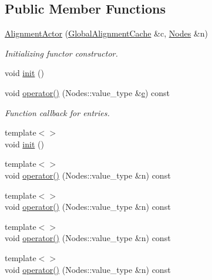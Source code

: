 \subsection*{Public Member Functions}
\begin{DoxyCompactItemize}
\item 
\hyperlink{class_d_d4hep_1_1_alignments_1_1_alignment_actor_a4442541ec4416c08e7a36c7b5eaacbfb}{Alignment\+Actor} (\hyperlink{class_d_d4hep_1_1_alignments_1_1_global_alignment_cache}{Global\+Alignment\+Cache} \&c, \hyperlink{class_d_d4hep_1_1_alignments_1_1_alignment_operator_a2f25eae1d38abc30a09f7a840ab0662a}{Nodes} \&n)
\begin{DoxyCompactList}\small\item\em Initializing functor constructor. \end{DoxyCompactList}\item 
void \hyperlink{class_d_d4hep_1_1_alignments_1_1_alignment_actor_a594062a18b6bedd5dfb66abd663bf42e}{init} ()
\item 
void \hyperlink{class_d_d4hep_1_1_alignments_1_1_alignment_actor_aecb3ed4747a7b5dcc6237af1082e7e1e}{operator()} (Nodes\+::value\+\_\+type \&\hyperlink{_volumes_8cpp_a8a9a1f93e9b09afccaec215310e64142}{e}) const
\begin{DoxyCompactList}\small\item\em Function callback for entries. \end{DoxyCompactList}\item 
{\footnotesize template$<$$>$ }\\void \hyperlink{class_d_d4hep_1_1_alignments_1_1_alignment_actor_a135e3ccc01f7f5214327dbdf9c568d2a}{init} ()
\item 
{\footnotesize template$<$$>$ }\\void \hyperlink{class_d_d4hep_1_1_alignments_1_1_alignment_actor_ac35fdc98b5c13a6c4736423cfb54f59e}{operator()} (Nodes\+::value\+\_\+type \&n) const
\item 
{\footnotesize template$<$$>$ }\\void \hyperlink{class_d_d4hep_1_1_alignments_1_1_alignment_actor_ab933803d7b23df70f2126470c6465029}{operator()} (Nodes\+::value\+\_\+type \&n) const
\item 
{\footnotesize template$<$$>$ }\\void \hyperlink{class_d_d4hep_1_1_alignments_1_1_alignment_actor_a58ec7e8e577e4654230f475aee598053}{operator()} (Nodes\+::value\+\_\+type \&n) const
\item 
{\footnotesize template$<$$>$ }\\void \hyperlink{class_d_d4hep_1_1_alignments_1_1_alignment_actor_aeccacf0e444121e6296b9d33135a23cc}{operator()} (Nodes\+::value\+\_\+type \&n) const
\end{DoxyCompactItemize}
